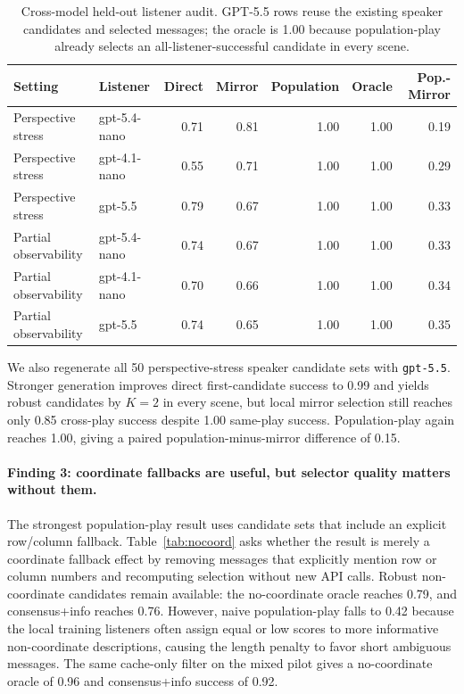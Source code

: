 \documentclass[10pt]{article}
\begin{document}
\begin{table}[H]
\centering
\small
\begin{tabular}{llrrrrr}
\toprule
Setting & Listener & Direct & Mirror & Population & Oracle & Pop.-Mirror \\
\midrule
Perspective stress & gpt-5.4-nano & 0.71 & 0.81 & 1.00 & 1.00 & 0.19 \\
Perspective stress & gpt-4.1-nano & 0.55 & 0.71 & 1.00 & 1.00 & 0.29 \\
Perspective stress & gpt-5.5 & 0.79 & 0.67 & 1.00 & 1.00 & 0.33 \\
Partial observability & gpt-5.4-nano & 0.74 & 0.67 & 1.00 & 1.00 & 0.33 \\
Partial observability & gpt-4.1-nano & 0.70 & 0.66 & 1.00 & 1.00 & 0.34 \\
Partial observability & gpt-5.5 & 0.74 & 0.65 & 1.00 & 1.00 & 0.35 \\
\bottomrule
\end{tabular}
\caption{Cross-model held-out listener audit. GPT-5.5 rows reuse the existing speaker candidates and selected messages; the oracle is 1.00 because population-play already selects an all-listener-successful candidate in every scene.}
\label{tab:crossmodel}
\end{table}

We also regenerate all 50 perspective-stress speaker candidate sets with \texttt{gpt-5.5}. Stronger generation improves direct first-candidate success to 0.99 and yields robust candidates by $K=2$ in every scene, but local mirror selection still reaches only 0.85 cross-play success despite 1.00 same-play success. Population-play again reaches 1.00, giving a paired population-minus-mirror difference of 0.15.

\paragraph{Finding 3: coordinate fallbacks are useful, but selector quality matters without them.}
The strongest population-play result uses candidate sets that include an explicit row/column fallback. Table~\ref{tab:nocoord} asks whether the result is merely a coordinate fallback effect by removing messages that explicitly mention row or column numbers and recomputing selection without new API calls. Robust non-coordinate candidates remain available: the no-coordinate oracle reaches 0.79, and consensus+info reaches 0.76. However, naive population-play falls to 0.42 because the local training listeners often assign equal or low scores to more informative non-coordinate descriptions, causing the length penalty to favor short ambiguous messages. The same cache-only filter on the mixed pilot gives a no-coordinate oracle of 0.96 and consensus+info success of 0.92.
\end{document}
